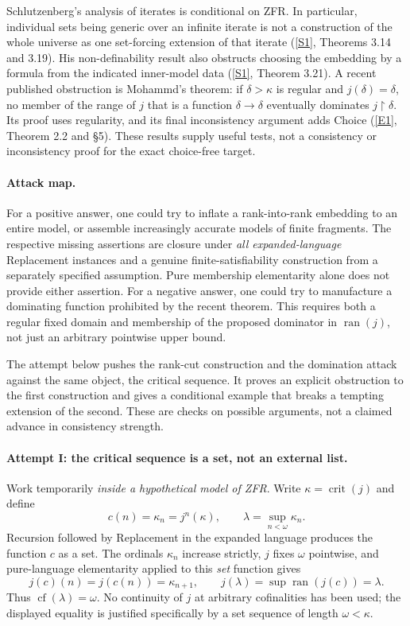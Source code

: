 \documentclass[11pt]{article}
\newcommand{\sref}[2]{\hyperlink{source:#1:#2}{[S#2]}}
\newcommand{\eref}[2]{\hyperlink{extra:#1:#2}{[E#2]}}
\begin{document}
Schlutzenberg's analysis of iterates is conditional on ZFR.  In particular,
individual sets being generic over an infinite iterate is not a construction
of the whole universe as one set-forcing extension of that iterate
(\sref{statement}{1}, Theorems 3.14 and 3.19).  His non-definability result also
obstructs choosing the embedding by a formula from the indicated inner-model
data (\sref{statement}{1}, Theorem 3.21).
A recent published obstruction is Mohammd's theorem: if $\delta>\kappa$
is regular and $j(\delta)=\delta$, no member of the range of $j$ that is a
function $\delta\to\delta$ eventually dominates $j\!\upharpoonright\!\delta$.
Its proof uses regularity, and its final inconsistency argument adds Choice
(\eref{statement}{1}, Theorem 2.2 and \S5).  These results supply useful tests, not a
consistency or inconsistency proof for the exact choice-free target.

\paragraph{Attack map.}
For a positive answer, one could try to inflate a rank-into-rank embedding to
an entire model, or assemble increasingly accurate models of finite fragments.
The respective missing assertions are closure under \emph{all expanded-language}
Replacement instances and a genuine finite-satisfiability construction from a
separately specified assumption.  Pure membership elementarity alone does not
provide either assertion.  For a negative answer, one could try to manufacture
a dominating function prohibited by the recent theorem.  This requires both a
regular fixed domain and membership of the proposed dominator in
$\operatorname{ran}(j)$, not just an arbitrary pointwise upper bound.

The attempt below pushes the rank-cut construction and the domination attack
against the same object, the critical sequence.  It proves an explicit
obstruction to the first construction and gives a conditional example that
breaks a tempting extension of the second.  These are checks on possible
arguments, not a claimed advance in consistency strength.

\paragraph{Attempt I: the critical sequence is a set, not an external list.}
Work temporarily \emph{inside a hypothetical model of ZFR}.  Write
$\kappa=\operatorname{crit}(j)$ and define
\begin{equation}\label{statement:critical-sequence}
 c(n)=\kappa_n=j^n(\kappa),\qquad
 \lambda=\sup_{n<\omega}\kappa_n.
\end{equation}
Recursion followed by Replacement in the expanded language produces the
function $c$ as a set.  The ordinals $\kappa_n$ increase strictly, $j$ fixes
$\omega$ pointwise, and pure-language elementarity applied to this \emph{set}
function gives
\[
 j(c)(n)=j(c(n))=\kappa_{n+1},\qquad
 j(\lambda)=\sup\operatorname{ran}(j(c))=\lambda.
\]
Thus $\operatorname{cf}(\lambda)=\omega$.  No continuity of $j$ at arbitrary
cofinalities has been used; the displayed equality is justified specifically
by a set sequence of length $\omega<\kappa$.
\end{document}
